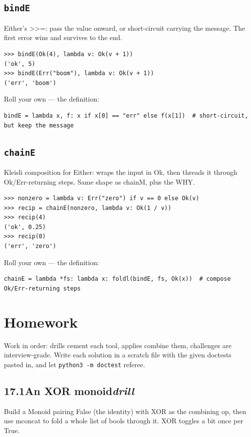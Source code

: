 \documentclass[10pt,letterpaper]{book}
\begin{document}
\subsection{\texttt{bindE}}\label{def:bindE}
Either's >>=: pass the value onward, or short-circuit carrying the message. The first error wins and survives to the end.
\begin{lstlisting}[style=ex]
>>> bindE(Ok(4), lambda v: Ok(v + 1))
('ok', 5)
>>> bindE(Err("boom"), lambda v: Ok(v + 1))
('err', 'boom')
\end{lstlisting}

Roll your own --- the definition:

\begin{lstlisting}[style=ex]
bindE = lambda x, f: x if x[0] == "err" else f(x[1])  # short-circuit, but keep the message
\end{lstlisting}
\subsection{\texttt{chainE}}\label{def:chainE}
Kleisli composition for Either: wraps the input in Ok, then threads it through Ok/Err-returning steps. Same shape as chainM, plus the WHY.
\begin{lstlisting}[style=ex]
>>> nonzero = lambda v: Err("zero") if v == 0 else Ok(v)
>>> recip = chainE(nonzero, lambda v: Ok(1 / v))
>>> recip(4)
('ok', 0.25)
>>> recip(0)
('err', 'zero')
\end{lstlisting}

Roll your own --- the definition:

\begin{lstlisting}[style=ex]
chainE = lambda *fs: lambda x: foldl(bindE, fs, Ok(x))  # compose Ok/Err-returning steps
\end{lstlisting}
\section{Homework}
Work in order: drills cement each tool, applies combine them,
challenges are interview-grade. Write each solution in a scratch file with
the given doctests pasted in, and let \texttt{python3 -m doctest} referee.
\subsection*{17.1\quad An XOR monoid\hfill\textnormal{\textit{drill}}}
Build a Monoid pairing False (the identity) with XOR as the combining op, then use mconcat to fold a whole list of bools through it. XOR toggles a bit once per True.
\end{document}
